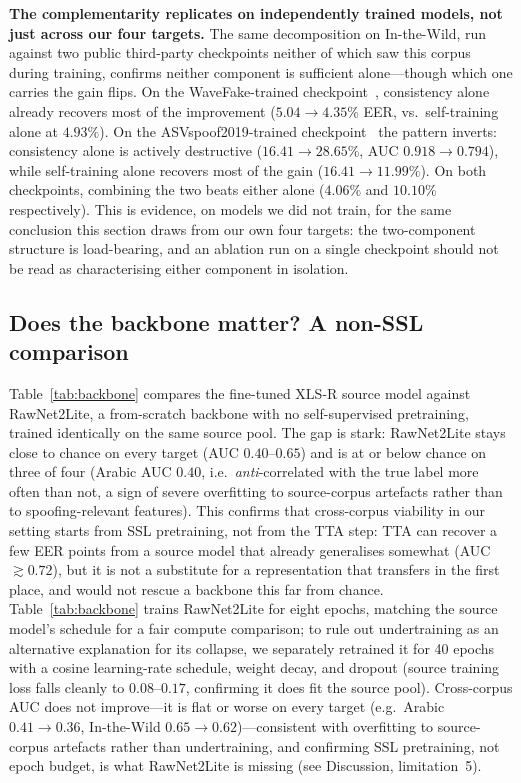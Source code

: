 \documentclass[conference]{IEEEtran}
\begin{document}
\textbf{The complementarity replicates on independently trained models, not
just across our four targets.} The same decomposition on In-the-Wild, run
against two public third-party checkpoints neither of which saw this corpus
during training, confirms neither component is sufficient alone---though which
one carries the gain flips. On the WaveFake-trained
checkpoint~\cite{shiftyspeech}, consistency
alone already recovers most of the improvement ($5.04\!\to\!4.35\%$ EER,
vs.\ self-training alone at $4.93\%$). On the
ASVspoof2019-trained checkpoint~\cite{deepfensehf}
the pattern inverts: consistency alone is actively destructive
($16.41\!\to\!28.65\%$, AUC $0.918\!\to\!0.794$), while self-training alone
recovers most of the gain ($16.41\!\to\!11.99\%$). On both checkpoints,
combining the two beats either alone ($4.06\%$ and $10.10\%$ respectively).
This is evidence, on models we did not train, for the same conclusion this
section draws from our own four targets: the two-component structure is
load-bearing, and an ablation run on a single checkpoint should not be read
as characterising either component in isolation.

\subsection{Does the backbone matter? A non-SSL comparison}
\label{sec:backbone}
Table~\ref{tab:backbone} compares the fine-tuned XLS-R source model against
RawNet2Lite, a from-scratch backbone with no self-supervised pretraining,
trained identically on the same source pool. The gap is stark: RawNet2Lite
stays close to chance on every target (AUC $0.40$--$0.65$) and is at or below
chance on three of four (Arabic AUC $0.40$, i.e.\ \emph{anti}-correlated with
the true label more often than not, a sign of severe overfitting to
source-corpus artefacts rather than to spoofing-relevant features). This confirms that cross-corpus viability
in our setting starts from SSL pretraining, not from the TTA step: TTA can
recover a few EER points from a source model that already generalises somewhat
(AUC $\gtrsim\!0.72$), but it is not a substitute for a representation that
transfers in the first place, and would not rescue a backbone this far from
chance. Table~\ref{tab:backbone} trains RawNet2Lite for eight epochs, matching
the source model's schedule for a fair compute comparison; to rule out
undertraining as an alternative explanation for its collapse, we separately
retrained it for 40 epochs with a cosine learning-rate schedule, weight decay,
and dropout (source training loss falls cleanly to $0.08$--$0.17$, confirming
it does fit the source pool). Cross-corpus AUC does not improve---it is flat
or worse on every target (e.g.\ Arabic $0.41\!\to\!0.36$, In-the-Wild
$0.65\!\to\!0.62$)---consistent with overfitting to source-corpus artefacts
rather than undertraining, and confirming SSL pretraining, not epoch budget,
is what RawNet2Lite is missing (see Discussion, limitation~5).
\end{document}

